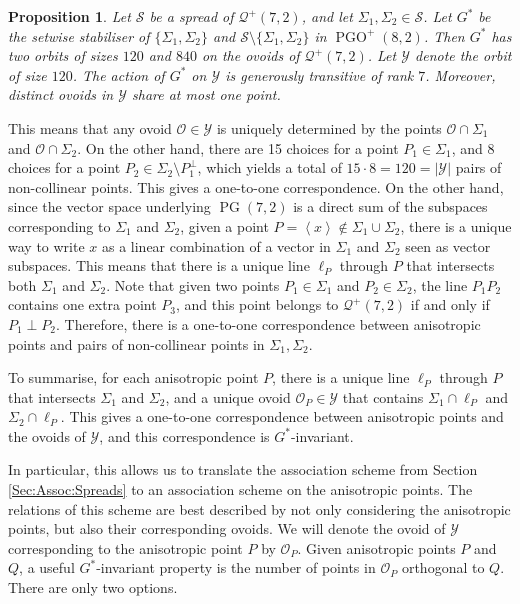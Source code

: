 \documentclass[a4paper]{article}
\newtheorem{prop}[thm]{Proposition}
\theoremstyle{definition}
\newcommand{\vspan}[1]{\left \langle #1 \right \rangle}
\newcommand{\mo}{\mathcal O}
\newcommand{\mq}{\mathcal Q}
\newcommand{\ms}{\mathcal S}
\newcommand{\my}{\mathcal Y}
\DeclareMathOperator{\PG}{PG}
\newcommand{\pg}{\PG}
\DeclareMathOperator{\PGO}{PGO}
\begin{document}
\begin{prop}
 \label{Prop:by triality}
 Let $\ms$ be a spread of $\mq^+(7,2)$, and let $\Sigma_1, \Sigma_2 \in \ms$.
 Let $G^*$ be the setwise stabiliser of $\{\Sigma_1, \Sigma_2\}$ and $\ms \setminus \{\Sigma_1, \Sigma_2\}$ in $\PGO^+(8,2)$.
 Then $G^*$ has two orbits of sizes $120$ and $840$ on the ovoids of $\mq^+(7,2)$.
 Let $\my$ denote the orbit of size $120$.
 The action of $G^*$ on $\my$ is generously transitive of rank $7$.
 Moreover, distinct ovoids in $\my$ share at most one point.
\end{prop}

This means that any ovoid $\mo \in \my$ is uniquely determined by the points $\mo \cap \Sigma_1$ and $\mo \cap \Sigma_2$.
On the other hand, there are 15 choices for a point $P_1 \in \Sigma_1$, and 8 choices for a point $P_2 \in \Sigma_2 \setminus P_1^\perp$, which yields a total of $15 \cdot 8 = 120 = |\my|$ pairs of non-collinear points.
This gives a one-to-one correspondence.
On the other hand, since the vector space underlying $\pg(7,2)$ is a direct sum of the subspaces corresponding to $\Sigma_1$ and $\Sigma_2$, given a point $P = \vspan x \notin \Sigma_1 \cup \Sigma_2$, there is a unique way to write $x$ as a linear combination of a vector in $\Sigma_1$ and $\Sigma_2$ seen as vector subspaces.
This means that there is a unique line $\ell_P$ through $P$ that intersects both $\Sigma_1$ and $\Sigma_2$.
Note that given two points $P_1 \in \Sigma_1$ and $P_2 \in \Sigma_2$, the line $P_1 P_2$ contains one extra point $P_3$, and this point belongs to $\mq^+(7,2)$ if and only if $P_1 \perp P_2$.
Therefore, there is a one-to-one correspondence between anisotropic points and pairs of non-collinear points in $\Sigma_1, \Sigma_2$.

To summarise, for each anisotropic point $P$, there is a unique line $\ell_P$ through $P$ that intersects $\Sigma_1$ and $\Sigma_2$, and a unique ovoid $\mo_P \in \my$ that contains $\Sigma_1 \cap \ell_P$ and $\Sigma_2 \cap \ell_P$.
This gives a one-to-one correspondence between anisotropic points and the ovoids of $\my$, and this correspondence is $G^*$-invariant.

In particular, this allows us to translate the association scheme from Section \ref{Sec:Assoc:Spreads} to an association scheme on the anisotropic points.
The relations of this scheme are best described by not only considering the anisotropic points, but also their corresponding ovoids.
We will denote the ovoid of $\my$ corresponding to the anisotropic point $P$ by $\mo_P$.
Given anisotropic points $P$ and $Q$, a useful $G^*$-invariant property is the number of points in $\mo_P$ orthogonal to $Q$.
There are only two options.
\end{document}

